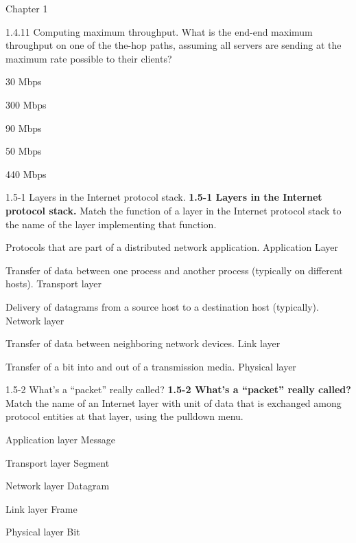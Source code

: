 \documentclass[a4paper]{article}
\begin{document}
\begin{quiz}{Chapter 1}
\begin{multi}[points=1,shuffle=true]{1.4.11 Computing maximum throughput.}
What is the end-end maximum throughput on one of the the-hop paths, assuming all servers are sending at the maximum rate possible to their clients?
\item* 30 Mbps
\item 300 Mbps
\item 90 Mbps
\item 50 Mbps
\item 440 Mbps
\end{multi}

\begin{matching}[points=1,shuffle=true]{1.5-1 Layers in the Internet protocol stack.}
\textbf{1.5-1 Layers in the Internet protocol stack.}
Match the function of a layer in the Internet protocol stack to the name of the layer implementing that function.

\item Protocols that are part of a distributed network application. \answer Application Layer
\item Transfer of data between one process and another process (typically on different hosts). \answer Transport layer
\item Delivery of datagrams from a source host to a destination host (typically). \answer Network layer
\item Transfer of data between neighboring network devices. \answer Link layer
\item Transfer of a bit into and out of a transmission media. \answer Physical layer
\end{matching}

\begin{matching}[points=1,shuffle=true]{1.5-2 What's a ``packet'' really called?}
\textbf{1.5-2 What's a ``packet'' really called?}
Match the name of an Internet layer with unit of data that is exchanged among protocol entities at that layer, using the pulldown menu.
\item Application layer \answer Message
\item Transport layer \answer Segment
\item Network layer \answer Datagram
\item Link layer \answer Frame
\item Physical layer \answer Bit
\end{matching}


\end{quiz}
\end{document}
